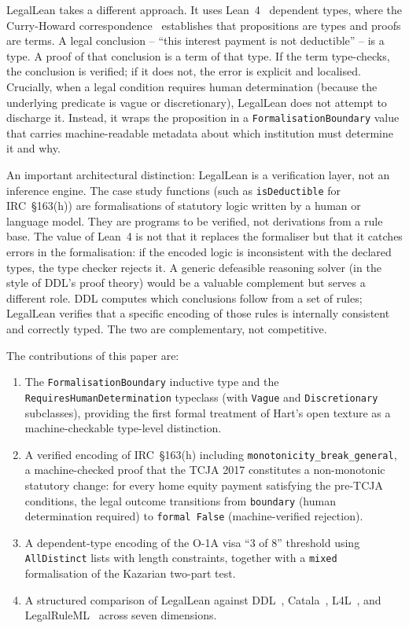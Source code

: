\documentclass[runningheads]{llncs}
\begin{document}
LegalLean takes a different approach. It uses Lean~4~\cite{demoura2021lean4}
dependent types, where the Curry-Howard
correspondence~\cite{curry1934functionality,howard1980formulae} establishes that
propositions are types and proofs are terms. A legal conclusion -- ``this
interest payment is not deductible'' -- is a type. A proof of that conclusion is
a term of that type. If the term type-checks, the conclusion is verified; if it
does not, the error is explicit and localised. Crucially, when a legal condition
requires human determination (because the underlying predicate is vague or
discretionary), LegalLean does not attempt to discharge it. Instead, it wraps
the proposition in a \texttt{FormalisationBoundary} value that carries
machine-readable metadata about which institution must determine it and why.

An important architectural distinction: LegalLean is a verification layer, not an inference engine. The case study functions (such as \texttt{isDeductible} for IRC~\S163(h)) are formalisations of statutory logic written by a human or language model. They are programs to be verified, not derivations from a rule base. The value of Lean~4 is not that it replaces the formaliser but that it catches errors in the formalisation: if the encoded logic is inconsistent with the declared types, the type checker rejects it. A generic defeasible reasoning solver (in the style of DDL's proof theory) would be a valuable complement but serves a different role. DDL computes which conclusions follow from a set of rules; LegalLean verifies that a specific encoding of those rules is internally consistent and correctly typed. The two are complementary, not competitive.

The contributions of this paper are:
\begin{enumerate}
  \item The \texttt{FormalisationBoundary} inductive type and the
    \texttt{RequiresHumanDetermination} typeclass (with \texttt{Vague} and
    \texttt{Discretionary} subclasses), providing the first formal treatment of
    Hart's open texture as a machine-checkable type-level distinction.
  \item A verified encoding of IRC~\S163(h) including
    \texttt{monotonicity\_break\_general}, a machine-checked proof that the TCJA
    2017 constitutes a non-monotonic statutory change: for every home equity
    payment satisfying the pre-TCJA conditions, the legal outcome transitions
    from \texttt{boundary} (human determination required) to
    \texttt{formal~False} (machine-verified rejection).
  \item A dependent-type encoding of the O-1A visa ``3 of 8'' threshold using
    \texttt{AllDistinct} lists with length constraints, together with a
    \texttt{mixed} formalisation of the Kazarian two-part test.
  \item A structured comparison of LegalLean against
    DDL~\cite{governatori2005representing}, Catala~\cite{merigoux2021catala},
    L4L~\cite{hou2021l4l}, and LegalRuleML~\cite{palmirani2018modelling} across
    seven dimensions.
\end{enumerate}
\end{document}
